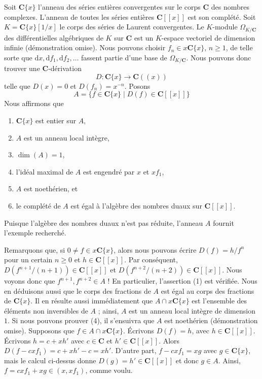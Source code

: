 \medskip\noindent
Soit $\mathbf{C}\{x\}$ l'anneau des séries entières convergentes sur
le corps $\mathbf{C}$ des nombres complexes. L'anneau de toutes les séries entières
$\mathbf{C}[[x]]$ est son complété. Soit $K = \mathbf{C}\{x\}[1/x]$
le corps des séries de Laurent convergentes. Le $K$-module
$\Omega_{K/\mathbf{C}}$ des différentielles algébriques
de $K$ sur $\mathbf{C}$ est un $K$-espace vectoriel de dimension infinie
(démonstration omise). Nous pouvons choisir $f_n \in x\mathbf{C}\{x\}$,
$n \geq 1$, de telle sorte que
$
\text{d}x, \text{d}f_1, \text{d}f_2, \ldots
$
fassent partie d'une base de $\Omega_{K/\mathbf{C}}$. Nous pouvons donc
trouver une $\mathbf{C}$-dérivation
$$
D : \mathbf{C}\{x\} \longrightarrow \mathbf{C}((x))
$$
telle que $D(x) = 0$ et $D(f_n) = x^{-n}$. Posons
$$
A = \{f \in \mathbf{C}\{x\} \mid D(f) \in \mathbf{C}[[x]]\}
$$
Nous affirmons que
\begin{enumerate}
\item $\mathbf{C}\{x\}$ est entier sur $A$,
\item $A$ est un anneau local intègre,
\item $\dim(A) = 1$,
\item l'idéal maximal de $A$ est engendré par $x$ et $xf_1$,
\item $A$ est noethérien, et
\item le complété de $A$ est égal à l'algèbre des nombres duaux
sur $\mathbf{C}[[x]]$.
\end{enumerate}
Puisque l'algèbre des nombres duaux n'est pas réduite, l'anneau $A$ fournit l'exemple recherché.

\medskip\noindent
Remarquons que, si $0 \not = f \in x\mathbf{C}\{x\}$, alors
nous pouvons écrire $D(f) = h/f^n$ pour un certain $n \geq 0$ et $h \in \mathbf{C}[[x]]$.
Par conséquent, $D(f^{n + 1}/(n + 1)) \in \mathbf{C}[[x]]$
et $D(f^{n + 2}/(n + 2)) \in \mathbf{C}[[x]]$. Nous voyons donc que
$f^{n + 1}, f^{n + 2} \in A$ !
En particulier, l'assertion (1) est vérifiée. Nous en déduisons aussi que
le corps des fractions de $A$ est égal au corps des fractions de
$\mathbf{C}\{x\}$. Il en résulte aussi immédiatement que
$A \cap x\mathbf{C}\{x\}$ est l'ensemble des éléments non inversibles de $A$ ; ainsi,
$A$ est un anneau local intègre de dimension $1$. Si nous pouvons prouver (4),
il s'ensuivra que $A$ est noethérien (démonstration omise).
Supposons que $f \in A \cap x\mathbf{C}\{x\}$. Écrivons
$D(f) = h$, avec $h \in \mathbf{C}[[x]]$. Écrivons $h = c + xh'$
avec $c \in \mathbf{C}$ et $h' \in \mathbf{C}[[x]]$. Alors
$D(f - cxf_1) = c + xh' - c = xh'$. D'autre part,
$f - cxf_1 = xg$ avec $g \in \mathbf{C}\{x\}$, mais le
calcul ci-dessus donne $D(g) = h' \in \mathbf{C}[[x]]$
et donc $g \in A$. Ainsi, $f = cxf_1 + xg \in (x, xf_1)$, comme voulu.

